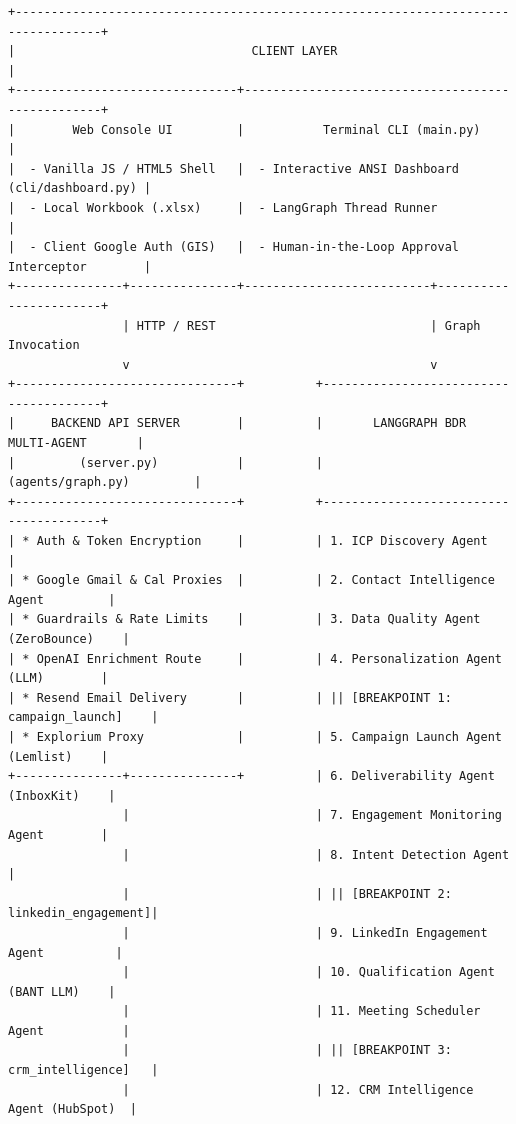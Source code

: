 \documentclass[10pt,letterpaper]{article}
\begin{document}
\begin{center}
\begin{minipage}{0.95\textwidth}
\begin{verbatim}
+----------------------------------------------------------------------------------+
|                                 CLIENT LAYER                                     |
+-------------------------------+--------------------------------------------------+
|        Web Console UI         |           Terminal CLI (main.py)                 |
|  - Vanilla JS / HTML5 Shell   |  - Interactive ANSI Dashboard (cli/dashboard.py) |
|  - Local Workbook (.xlsx)     |  - LangGraph Thread Runner                       |
|  - Client Google Auth (GIS)   |  - Human-in-the-Loop Approval Interceptor        |
+---------------+---------------+--------------------------+-----------------------+
                | HTTP / REST                              | Graph Invocation
                v                                          v
+-------------------------------+          +---------------------------------------+
|     BACKEND API SERVER        |          |       LANGGRAPH BDR MULTI-AGENT       |
|         (server.py)           |          |             (agents/graph.py)         |
+-------------------------------+          +---------------------------------------+
| * Auth & Token Encryption     |          | 1. ICP Discovery Agent                |
| * Google Gmail & Cal Proxies  |          | 2. Contact Intelligence Agent         |
| * Guardrails & Rate Limits    |          | 3. Data Quality Agent (ZeroBounce)    |
| * OpenAI Enrichment Route     |          | 4. Personalization Agent (LLM)        |
| * Resend Email Delivery       |          | || [BREAKPOINT 1: campaign_launch]    |
| * Explorium Proxy             |          | 5. Campaign Launch Agent (Lemlist)    |
+---------------+---------------+          | 6. Deliverability Agent (InboxKit)    |
                |                          | 7. Engagement Monitoring Agent        |
                |                          | 8. Intent Detection Agent             |
                |                          | || [BREAKPOINT 2: linkedin_engagement]|
                |                          | 9. LinkedIn Engagement Agent          |
                |                          | 10. Qualification Agent (BANT LLM)    |
                |                          | 11. Meeting Scheduler Agent           |
                |                          | || [BREAKPOINT 3: crm_intelligence]   |
                |                          | 12. CRM Intelligence Agent (HubSpot)  |

\end{verbatim}
\end{minipage}
\end{center}
\end{document}
